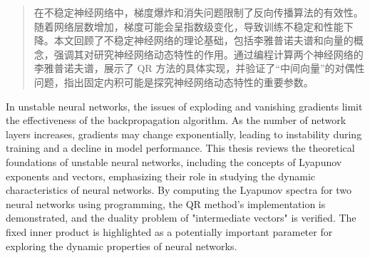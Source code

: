 

\begin{abstract}

  在不稳定神经网络中，梯度爆炸和消失问题限制了反向传播算法的有效性。随着网络层数增加，梯度可能会呈指数级变化，导致训练不稳定和性能下降。本文回顾了不稳定神经网络的理论基础，包括李雅普诺夫谱和向量的概念，强调其对研究神经网络动态特性的作用。通过编程计算两个神经网络的李雅普诺夫谱，展示了 QR 方法的具体实现，并验证了“中间向量”的对偶性问题，指出固定内积可能是探究神经网络动态特性的重要参数。
  
\end{abstract}

\begin{abstract*}
  
  In unstable neural networks, the issues of exploding and vanishing gradients limit the effectiveness of the backpropagation algorithm. As the number of network layers increases, gradients may change exponentially, leading to instability during training and a decline in model performance. This thesis reviews the theoretical foundations of unstable neural networks, including the concepts of Lyapunov exponents and vectors, emphasizing their role in studying the dynamic characteristics of neural networks. By computing the Lyapunov spectra for two neural networks using programming, the QR method's implementation is demonstrated, and the duality problem of "intermediate vectors" is verified. The fixed inner product is highlighted as a potentially important parameter for exploring the dynamic properties of neural networks.
  
\end{abstract*}
